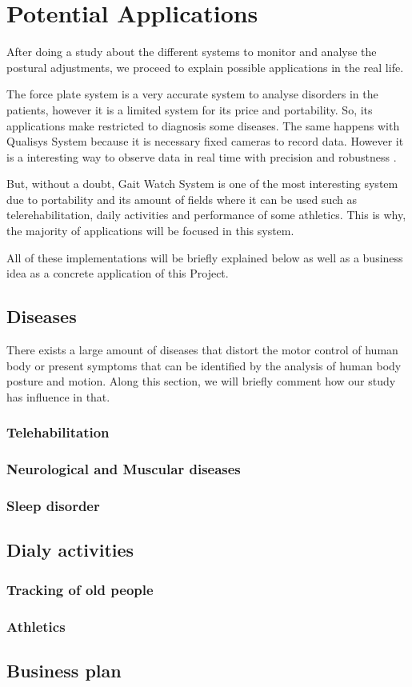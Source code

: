 \chapter{Potential Applications}
\label{ch:Applications}

After doing a study about the different systems to monitor and analyse the postural adjustments, we proceed to explain possible applications in the real life.

The force plate system is a very accurate system to analyse disorders in the patients, however it is a limited system for its price and portability. So, its applications make restricted to diagnosis some diseases.
The same happens with Qualisys System because it is necessary fixed cameras to record data. However it is a interesting way to observe data in real time with precision and robustness .

But, without a doubt, Gait Watch System is one of the most interesting system due to portability and its amount of fields where it can be used such as telerehabilitation, daily activities and performance of some athletics. This is why, the majority of applications will be focused in this system.

All of these implementations will be briefly explained below as well as a business idea as a concrete application of this Project.

\section{Diseases}
There exists a large amount of diseases that distort the motor control of human body or present symptoms that can be identified by the analysis of human body posture and motion. Along this section,  we will briefly comment how our study has influence in that.

\subsection{Telehabilitation}
\subsection{Neurological and Muscular diseases}
\subsection{Sleep disorder}

\section{Dialy activities }

\subsection{Tracking of old people}
\subsection{Athletics}

\section{Business plan }